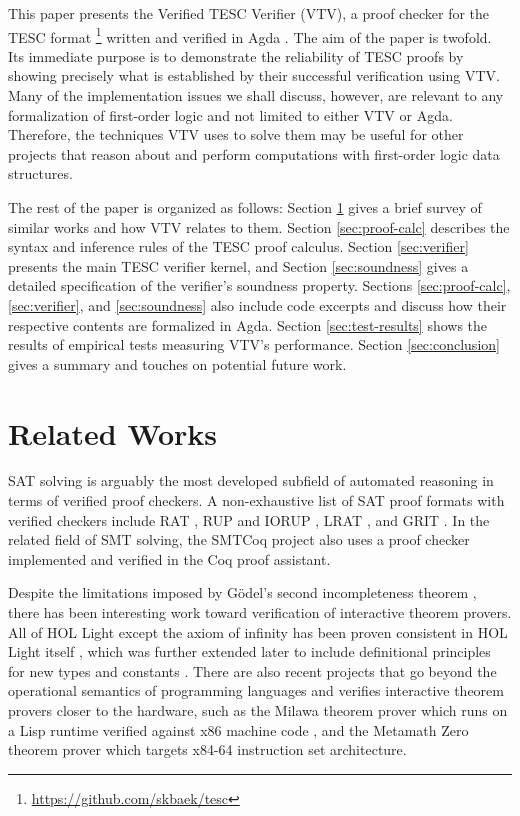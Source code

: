 \documentclass{lipics-v2021}
\begin{document}
This paper presents the Verified TESC Verifier (VTV), a proof checker for  
the TESC format \footnote{\url{https://github.com/skbaek/tesc}} written and verified 
in Agda \cite{bove2009brief}. The aim of the paper is twofold. Its immediate purpose is 
to demonstrate the reliability of TESC proofs by showing precisely what is established 
by their successful verification using VTV. Many of the implementation issues we shall 
discuss, however, are relevant to any formalization of first-order logic and not 
limited to either VTV or Agda. Therefore, the techniques VTV uses to solve them may be 
useful for other projects that reason about and perform computations with first-order 
logic data structures.

The rest of the paper is organized as follows:
Section \ref{sec:rel-works} gives a brief survey of similar works and how VTV relates to them.
Section \ref{sec:proof-calc} describes the syntax and inference rules of the TESC proof calculus.
Section \ref{sec:verifier} presents the main TESC verifier kernel, and
Section \ref{sec:soundness} gives a detailed specification of the verifier's soundness property.
Sections \ref{sec:proof-calc}, \ref{sec:verifier}, and \ref{sec:soundness} also include code 
excerpts and discuss how their respective contents are formalized in Agda.
Section \ref{sec:test-results} shows the  results of empirical tests measuring VTV's performance.
Section \ref{sec:conclusion} gives a summary and touches on potential future work.

\section{Related Works} \label{sec:rel-works}

SAT solving is arguably the most developed subfield of automated reasoning in terms of 
verified proof checkers. A non-exhaustive list of SAT proof formats with verified checkers
include RAT \cite{heule2013verifying}, RUP and IORUP \cite{heule2014bridging},
LRAT \cite{cruz2017lrat}, and GRIT \cite{cruz2017grit}. In the related field of SMT solving,
the SMTCoq project \cite{armand2011modular} also uses a proof checker implemented and
verified in the Coq proof assistant.

Despite the limitations imposed by G\"odel's second incompleteness theorem \cite{godel1931formal},
there has been interesting work toward verification of interactive theorem provers. 
All of HOL Light except the axiom of infinity has been proven consistent in HOL Light itself \cite{harrison2006towards}, 
which was further extended later to include definitional principles for new types 
and constants \cite{kumar2014hol}. There are also recent projects that go 
beyond the operational semantics of programming languages and verifies interactive theorem provers 
closer to the hardware, such as the Milawa theorem prover which runs on a Lisp runtime
verified against x86 machine code \cite{davis2015reflective}, and the Metamath Zero 
\cite{carneiro2019metamath} theorem prover which targets x84-64 instruction set architecture. 
\end{document}
